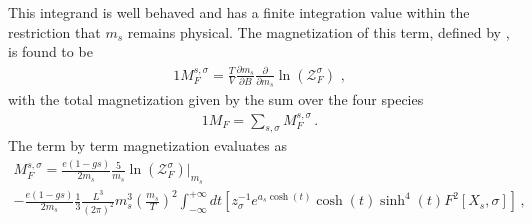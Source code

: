 This integrand is well behaved and has a finite integration value within the restriction that $m_{s}$ remains physical. The magnetization of this term, defined by , is found to be
\begin{alignat}{1}
    \label{FreelikeMag} M_{F}^{s,\sigma}=\frac{T}{V}\frac{\partial m_{s}}{\partial B}\frac{\partial}{\partial m_{s}}\ln(\mathcal{Z}_{F}^{\sigma})\,\,,
\end{alignat}
with the total magnetization given by the sum over the four species
\begin{alignat}{1}
    \label{TotalFreeMag} M_{F}=\sum_{s,\sigma}M_{F}^{s,\sigma}\,.
\end{alignat}
The term by term magnetization evaluates as
\begin{multline}
  \label{MagExplicit} M_{F}^{s,\sigma} = \frac{e(1-gs)}{2m_{s}}\frac{5}{m_{s}}\ln\left(\mathcal{Z}^{\sigma}_{F}\right)|_{m_{s}}\\
  -\frac{e(1-gs)}{2m_{s}}\frac{1}{3}\frac{L^{3}}{(2\pi)^{2}}m_{s}^{3}\left(\frac{m_{s}}{T}\right)^{2}
  \int_{-\infty}^{+\infty}dt\left[z_{\sigma}^{-1}e^{a_{s}\cosh(t)}\cosh(t)\sinh^{4}(t)F^{2}\left[X_{s},\sigma\right]\right]\,,
\end{multline}